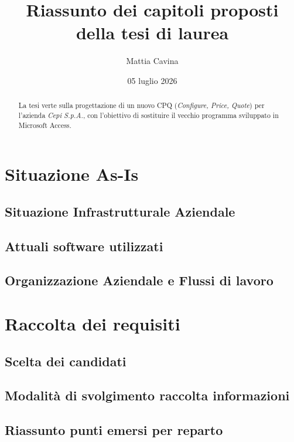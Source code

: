\documentclass[12pt, a4paper]{article}
\title{\textbf{Riassunto dei capitoli proposti della tesi di laurea}}
\author{Mattia Cavina}
\date{05 luglio 2026}
\begin{document}
\maketitle

\begin{abstract}
\noindent La tesi verte sulla progettazione di un nuovo CPQ (\textit{Configure, Price, Quote}) per l'azienda \textit{Cepi S.p.A.}, con l'obiettivo di sostituire il vecchio programma sviluppato in Microsoft Access.
\end{abstract}

\newpage

\tableofcontents

\newpage

\section{Situazione As-Is}
\subsection{Situazione Infrastrutturale Aziendale}
\subsection{Attuali software utilizzati}
\subsection{Organizzazione Aziendale e Flussi di lavoro}

\section{Raccolta dei requisiti}
\subsection{Scelta dei candidati}
\subsection{Modalità di svolgimento raccolta informazioni}
\subsection{Riassunto punti emersi per reparto}

\end{document}
